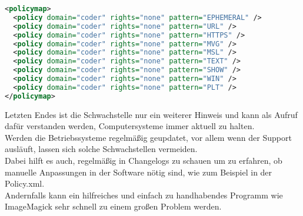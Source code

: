 \begin{lstlisting}[language=XML, caption=config/Policy.xml Inhalt,label={lst:lstlisting}]
<policymap>
  <policy domain="coder" rights="none" pattern="EPHEMERAL" />
  <policy domain="coder" rights="none" pattern="URL" />
  <policy domain="coder" rights="none" pattern="HTTPS" />
  <policy domain="coder" rights="none" pattern="MVG" />
  <policy domain="coder" rights="none" pattern="MSL" />
  <policy domain="coder" rights="none" pattern="TEXT" />
  <policy domain="coder" rights="none" pattern="SHOW" />
  <policy domain="coder" rights="none" pattern="WIN" />
  <policy domain="coder" rights="none" pattern="PLT" />
</policymap>
\end{lstlisting}
\vspace{5mm}

Letzten Endes ist die Schwachstelle nur ein weiterer Hinweis und kann als Aufruf dafür verstanden werden, Computersysteme immer aktuell zu halten.\\
Werden die Betriebssysteme regelmäßig geupdatet, vor allem wenn der Support ausläuft, lassen sich solche Schwachstellen vermeiden.\\
Dabei hilft es auch, regelmäßig in Changelogs zu schauen um zu erfahren, ob manuelle Anpassungen in der Software nötig sind, wie zum Beispiel in der Policy.xml.\\

Andernfalls kann ein hilfreiches und einfach zu handhabendes Programm wie ImageMagick sehr schnell zu einem großen Problem werden.
